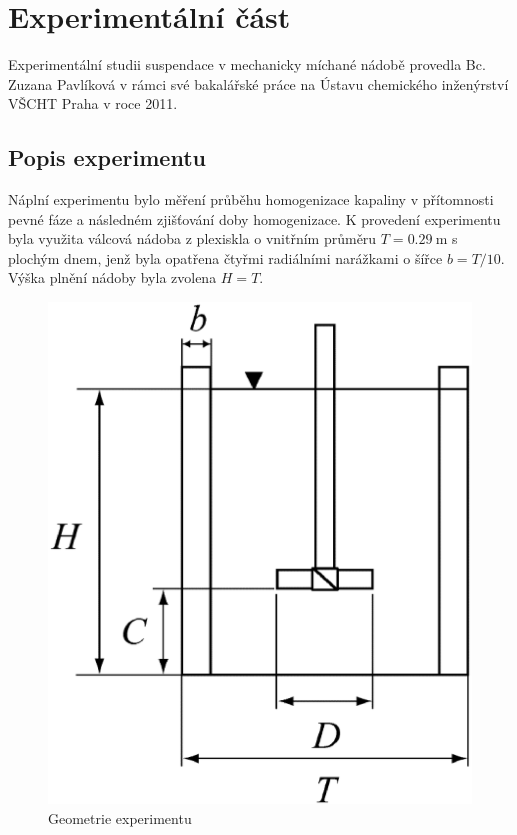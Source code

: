 \chapter{Experimentální část}
Experimentální studii suspendace v mechanicky míchané nádobě provedla Bc.\,Zuzana Pavlíková v rámci své bakalářské práce na Ústavu chemického inženýrství VŠCHT Praha v roce 2011.

\section{Popis experimentu}
\label{chap:exp}
Náplní experimentu bylo měření průběhu homogenizace kapaliny v přítomnosti pevné fáze a následném zjišťování doby homogenizace. K provedení experimentu byla využita válcová nádoba z plexiskla o vnitřním průměru $T=\SI{0.29}{\meter}$ s plochým dnem, jenž byla opatřena čtyřmi radiálními narážkami o šířce $b=T/10$. Výška plnění nádoby byla zvolena $H=T$. 

\begin{figure}[h!]
\begin{center}
\includegraphics[scale=0.45]{images/mujedit.eps}
\caption{Geometrie experimentu}
\label{fig:nadoba}
\end{center}
\end{figure} 

